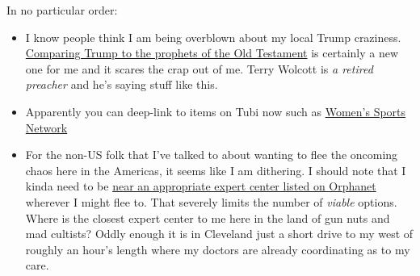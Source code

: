 In no particular order:

\begin{itemize}
\tightlist
\item
  I know people think I am being overblown about my local Trump
  craziness. \href{https://archive.ph/QA0rL}{Comparing Trump to the
  prophets of the Old Testament} is certainly a new one for me and it
  scares the crap out of me. Terry Wolcott is \emph{a retired preacher}
  and he's saying stuff like this.
\item
  Apparently you can deep-link to items on Tubi now such as
  \href{https://tubitv.com/live/692073/women-s-sports-network}{Women's
  Sports Network}
\item
  For the non-US folk that I've talked to about wanting to flee the
  oncoming chaos here in the Americas, it seems like I am dithering. I
  should note that I kinda need to be
  \href{https://www.orpha.net/en/expert-centres/centres/201?name=Cowden\%20Syndrome&consulting=both&age=adult&official=0}{near
  an appropriate expert center listed on Orphanet} wherever I might flee
  to. That severely limits the number of \emph{viable} options. Where is
  the closest expert center to me here in the land of gun nuts and mad
  cultists? Oddly enough it is in Cleveland just a short drive to my
  west of roughly an hour's length where my doctors are already
  coordinating as to my care.
\end{itemize}

